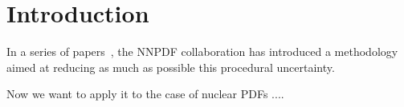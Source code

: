 \section{Introduction}
\label{sec:introduction}


In a series of
papers~\cite{Forte:2002fg,DelDebbio:2004qj,DelDebbio:2007ee,Ball:2008by,Rojo:2008ke,Ball:2009mk,Ball:2009qv,Ball:2010de,Ball:2011mu,Ball:2011uy,Ball:2012cx},
the NNPDF collaboration 
has introduced a methodology aimed at reducing as much as possible
this procedural uncertainty.

Now we want to apply it to the case of nuclear PDFs ....



